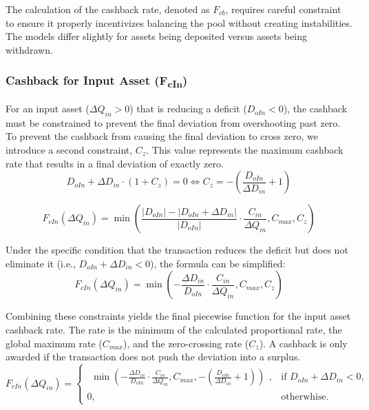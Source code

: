 The calculation of the cashback rate, denoted as $F_{cb}$, requires careful constraint to ensure it properly incentivizes balancing the pool without creating instabilities. The models differ slightly for assets being deposited versus assets being withdrawn.

\subsubsection{Cashback for Input Asset (F\textsubscript{cIn})}

For an input asset ($\Delta Q_{in} > 0$) that is reducing a deficit ($D_{oIn} < 0$), the cashback must be constrained to prevent the final deviation from overshooting past zero.
To prevent the cashback from causing the final deviation to cross zero, we introduce a second constraint, $C_z$. This value represents the maximum cashback rate that results in a final deviation of exactly zero.
\begin{equation}
	\label{eq:cashback_constraint for_amount_in}
	D_{oIn} + \Delta D_{in} \cdot (1 + C_z) = 0 \iff C_z = -\left(\frac{D_{oIn}}{\Delta D_{in}} + 1\right)
\end{equation}

\begin{equation}
	\label{eq:invariant_swap_cashback_in_function}
	F_{cIn}(\Delta Q_{in}) = \min\left(\frac{\lvert D_{oIn} \rvert - \lvert D_{oIn} + \Delta D_{in} \rvert}{ \lvert D_{oIn} \rvert} \cdot \frac{C_{in}}{\Delta Q_{in}}, C_{max}, C_z\right)
\end{equation}

Under the specific condition that the transaction reduces the deficit but does not eliminate it (i.e., $D_{oIn} + \Delta D_{in} < 0$), the formula can be simplified:
\begin{equation}
	\label{eq:invariant_swap_cashback_in_function_simplified}
	F_{cIn}(\Delta Q_{in}) = \min\left(-\frac{ \Delta D_{in}}{ D_{oIn}} \cdot \frac{C_{in}}{\Delta Q_{in}}, C_{max}, C_z\right)
\end{equation}


Combining these constraints yields the final piecewise function for the input asset cashback rate. The rate is the minimum of the calculated proportional rate, the global maximum rate ($C_{max}$), and the zero-crossing rate ($C_z$). A cashback is only awarded if the transaction does not push the deviation into a surplus.
\begin{equation}
	\label{eq:swap_invariant_cashback_in_function_final}
	F_{cIn}(\Delta Q_{in}) = \begin{cases}
		\begin{aligned} \min\left(-\frac{ \Delta D_{in}}{ D_{oIn}} \cdot \frac{C_{in}}{\Delta Q_{in}}, C_{max}, -\left(\frac{D_{oIn}}{\Delta D_{in}} + 1\right)\right) \end{aligned}, & \text{if } D_{oIn} + \Delta D_{in} < 0, \\
		0, & \text{otherwhise.}
	\end{cases}	
\end{equation}

